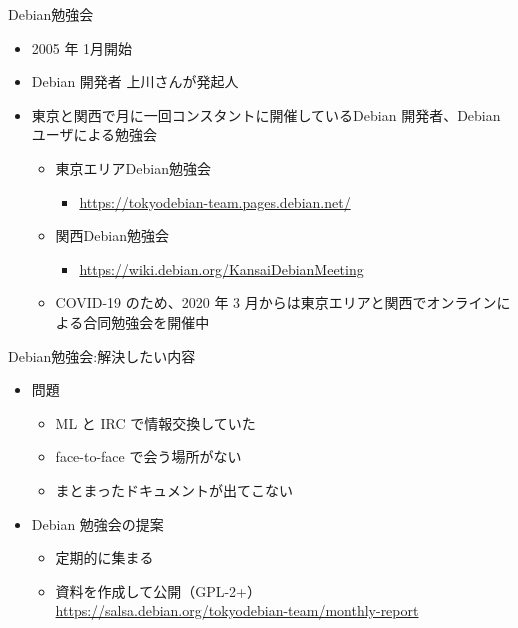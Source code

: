 \begin{frame}{Debian勉強会}

\begin{itemize}
 \item 2005 年 1月開始
 \item Debian 開発者 上川さんが発起人
 \item 東京と関西で月に一回コンスタントに開催しているDebian 開発者、Debian ユーザによる勉強会
   \begin{itemize}
   \item 東京エリアDebian勉強会
     \begin{itemize}
     \item \url{https://tokyodebian-team.pages.debian.net/}
     \end{itemize}
   \item 関西Debian勉強会
     \begin{itemize}
     \item \url{https://wiki.debian.org/KansaiDebianMeeting}
     \end{itemize}
   \item COVID-19 のため、2020 年 3 月からは東京エリアと関西でオンラインによる合同勉強会を開催中
   \end{itemize}
\end{itemize}

\end{frame}


\begin{frame}{Debian勉強会:解決したい内容}

\begin{itemize}
 \item 問題
   \begin{itemize}
   \item ML と IRC で情報交換していた
   \item face-to-face で会う場所がない
   \item まとまったドキュメントが出てこない
   \end{itemize}
 \item Debian 勉強会の提案
   \begin{itemize}
   \item 定期的に集まる
   \item 資料を作成して公開（GPL-2+） \\
	 {\small \url{https://salsa.debian.org/tokyodebian-team/monthly-report}}
   \end{itemize}
\end{itemize}

\end{frame}


